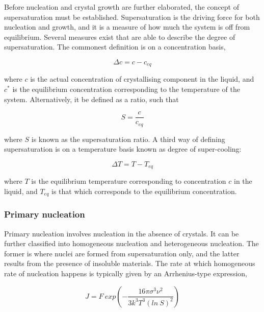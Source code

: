 Before nucleation and crystal growth are further elaborated, the concept of supersaturation must be established. Supersaturation is the driving force for both nucleation and growth, and it is a measure of how much the system is off from equilibrium. Several measures exist that are able to describe the degree of supersaturation. The commonest definition is on a concentration basis,

\begin{equation}
    \Delta c = c - c_{eq}
\end{equation}

\noindent where $c$ is the actual concentration of crystallising component in the liquid, and $c^*$ is the equilibrium concentration corresponding to the temperature of the system. Alternatively, it be defined as a ratio, such that

\begin{equation} \label{eq: supersaturation ratio}
    S = \frac{c}{c_{eq}}
\end{equation}

\noindent where $S$ is known as the supersaturation ratio. A third way of defining supersaturation is on a temperature basis known as degree of super-cooling:

\begin{equation}
     \Delta T = T - T_{eq}
\end{equation}

\noindent where $T$ is the equilibrium temperature corresponding to concentration $c$ in the liquid, and $T_{eq}$ is that which corresponds to the equilibrium concentration. 

\subsubsection{Primary nucleation}

Primary nucleation involves nucleation in the absence of crystals. \cite{seader_separation_2011} It can be further classified into homogeneous nucleation and heterogeneous nucleation. The former is where nuclei are formed from supersaturation only, and the latter results from the presence of insoluble materials. \cite{richardson} The rate at which homogeneous rate of nucleation happens is typically given by an Arrhenius-type expression, \cite{richardson}

\begin{equation}
     J = F~exp(-\frac{16 \pi \sigma^3 \nu^2}{3 k^3 T^3 (ln~S)^2})
\end{equation}

